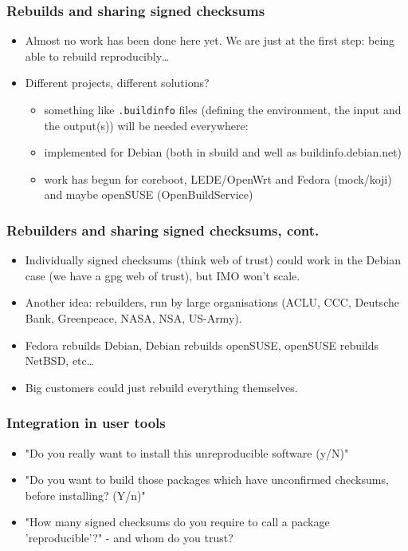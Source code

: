 \documentclass[14pt,aspectratio=169]{beamer}
\begin{document}
\begin{frame}
 \frametitle{Rebuilds and sharing signed checksums}
 \begin{itemize}
  \item Almost no work has been done here yet. We are just at the first step:
  being able to rebuild reproducibly…
  \item Different projects, different solutions?
 \begin{itemize}
  \item<2> something like \texttt{.buildinfo} files (defining the environment,
  the input and the output(s)) will be needed everywhere:
  \item<2> implemented for Debian (both in sbuild and well as
  buildinfo.debian.net)
  \item<2> work has begun for coreboot, LEDE/OpenWrt and Fedora (mock/koji)
  and maybe openSUSE (OpenBuildService)
 \end{itemize}
 \end{itemize}
\end{frame}

\begin{frame}
 \frametitle{Rebuilders and sharing signed checksums, cont.}
 \begin{itemize}
  \item Individually signed checksums (think web of trust) could work in the
  Debian case (we have a gpg web of trust), but IMO won't scale.
  \item { Another idea: rebuilders, run by large organisations
  (ACLU, CCC, Deutsche Bank, Greenpeace, NASA, NSA, US-Army).}
  \item Fedora rebuilds Debian, Debian rebuilds openSUSE, openSUSE rebuilds
  NetBSD, etc…
  \item Big customers could just rebuild everything themselves.
 \end{itemize}
\end{frame}


\begin{frame}
 \frametitle{Integration in user tools}
 \begin{itemize}
  \item "Do you really want to install this unreproducible software (y/N)"
  \item<2-3> "Do you want to build those packages which have unconfirmed checksums,
  before installing? (Y/n)"
  \item<3>{ "How many signed checksums do you require to call a package
  'reproducible'?" - and whom do you trust?}
 \end{itemize}
\end{frame}
\end{document}
